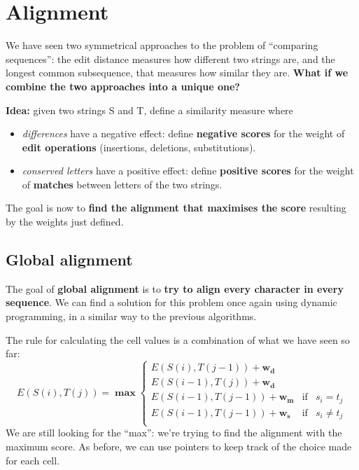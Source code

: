 \documentclass[../main.tex]{subfiles}
\begin{document}
\section{Alignment}

We have seen two symmetrical approaches to the problem of ``comparing sequences'': the edit distance measures how different two strings are, and the longest common subsequence, that measures how similar they are.
\textbf{What if we combine the two approaches into a unique one?}

\textbf{Idea:} given two strings S and T, define a similarity measure where
\begin{itemize}
	\item \emph{differences} have a negative effect: define \textbf{negative scores} for the weight of \textbf{edit operations} (insertions, deletions, substitutions).
	\item \emph{conserved letters} have a positive effect: define \textbf{positive scores} for the weight of \textbf{matches} between letters of the two strings.
\end{itemize}

The goal is now to \textbf{find the alignment that maximises the score} resulting by the weights just defined.

\subsection{Global alignment}

The goal of \textbf{global alignment} is to \textbf{try to align every character in every sequence}. We can find a solution for this problem once again using dynamic programming, in a similar way to the previous algorithms.

The rule for calculating the cell values is a combination of what we have seen so far:
$$
	E(S(i), T(j)) = \bm{\max} \left\{\begin{array}{rcl}
		E(S(i), T(j-1)) + \mathbf{w_d}                              \\
		E(S(i-1), T(j)) + \mathbf{w_d}                              \\
		E(S(i-1), T(j-1)) + \mathbf{w_m} & \mbox{if} & s_i = t_j    \\
		E(S(i-1), T(j-1)) + \mathbf{w_s} & \mbox{if} & s_i \neq t_j \\
	\end{array}
	\right.
$$
We are still looking for the ``max'': we're trying to find the alignment with the maximum score.
As before, we can use pointers to keep track of the choice made for each cell.
\end{document}
